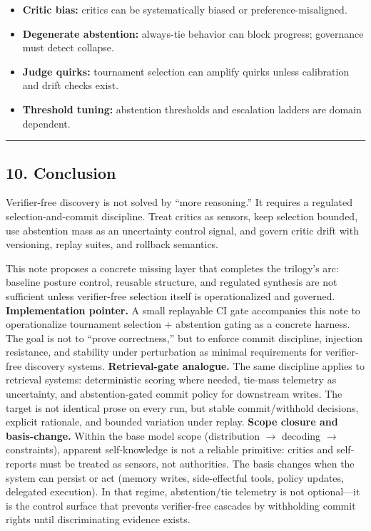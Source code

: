 \documentclass[11pt]{article}
\providecommand{\tightlist}{%
  \setlength{\itemsep}{0pt}\setlength{\parskip}{0pt}}
\begin{document}
\begin{itemize}
\tightlist
\item \textbf{Critic bias:} critics can be systematically biased or preference-misaligned.
\item \textbf{Degenerate abstention:} always-tie behavior can block progress; governance must detect collapse.
\item \textbf{Judge quirks:} tournament selection can amplify quirks unless calibration and drift checks exist.
\item \textbf{Threshold tuning:} abstention thresholds and escalation ladders are domain dependent.
\end{itemize}

\begin{center}\rule{0.5\linewidth}{0.5pt}\end{center}

\hypertarget{conclusion}{%
\subsection{10. Conclusion}\label{conclusion}}

Verifier-free discovery is not solved by ``more reasoning.'' It requires a regulated selection-and-commit discipline. Treat critics as sensors, keep selection bounded, use abstention mass as an uncertainty control signal, and govern critic drift with versioning, replay suites, and rollback semantics.

This note proposes a concrete missing layer that completes the trilogy's arc: baseline posture control, reusable structure, and regulated synthesis are not sufficient unless verifier-free selection itself is operationalized and governed.
\noindent\textbf{Implementation pointer.} A small replayable CI gate accompanies this note to operationalize tournament selection + abstention gating as a concrete harness. The goal is not to ``prove correctness,'' but to enforce commit discipline, injection resistance, and stability under perturbation as minimal requirements for verifier-free discovery systems.
\noindent\textbf{Retrieval-gate analogue.} The same discipline applies to retrieval systems: deterministic scoring where needed, tie-mass telemetry as uncertainty, and abstention-gated commit policy for downstream writes. The target is not identical prose on every run, but stable commit/withhold decisions, explicit rationale, and bounded variation under replay.
\noindent\textbf{Scope closure and basis-change.}
Within the base model scope (distribution $\rightarrow$ decoding $\rightarrow$ constraints), apparent self-knowledge is not a reliable primitive: critics and self-reports must be treated as sensors, not authorities.
The basis changes when the system can persist or act (memory writes, side-effectful tools, policy updates, delegated execution).
In that regime, abstention/tie telemetry is not optional---it is the control surface that prevents verifier-free cascades by withholding commit rights until discriminating evidence exists.
\end{document}
